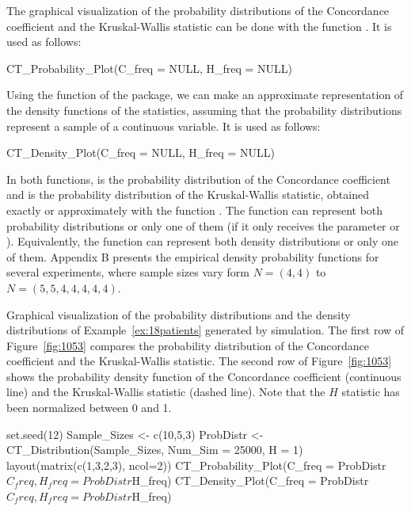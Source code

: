 The graphical visualization of the probability distributions of the Concordance coefficient and the Kruskal-Wallis statistic can be done with the function . It is used as follows:
\begin{example}
CT_Probability_Plot(C_freq = NULL, H_freq = NULL)
\end{example}

Using the function  of the  package, we can make an approximate representation of the density functions of the statistics, assuming that the probability distributions represent a sample of a continuous variable. It is used as follows:
\begin{example}
CT_Density_Plot(C_freq = NULL, H_freq = NULL)
\end{example}

In both functions,  is the probability distribution of the Concordance coefficient and  is the probability distribution of the Kruskal-Wallis statistic, obtained exactly or approximately with the function . The function  can represent both probability distributions or only one of them (if it only receives the parameter  or ). Equivalently, the function  can represent both density distributions or only one of them. Appendix B presents the empirical density probability functions for several experiments, where sample sizes vary form $N=(4,4)$ to $N=(5,5,4,4,4,4,4)$.

\setcounter{exmp}{1}
\begin{exmp}[Cont.] 
Graphical visualization of the probability distributions and the density distributions of Example~\ref{ex:18patients} generated by simulation. The first row of Figure~\ref{fig:1053} compares the probability distribution of the Concordance coefficient and the Kruskal-Wallis statistic. The second row of Figure~\ref{fig:1053} shows the probability density function of the Concordance coefficient (continuous line) and the Kruskal-Wallis statistic (dashed line). Note that the $H$ statistic has been normalized between 0 and 1.
\end{exmp} 

\begin{example}
set.seed(12)
Sample_Sizes <- c(10,5,3)
ProbDistr <- CT_Distribution(Sample_Sizes, Num_Sim = 25000, H = 1)
layout(matrix(c(1,3,2,3), ncol=2))
CT_Probability_Plot(C_freq = ProbDistr$C_freq, H_freq = ProbDistr$H_freq)
CT_Density_Plot(C_freq = ProbDistr$C_freq, H_freq = ProbDistr$H_freq)
\end{example}

